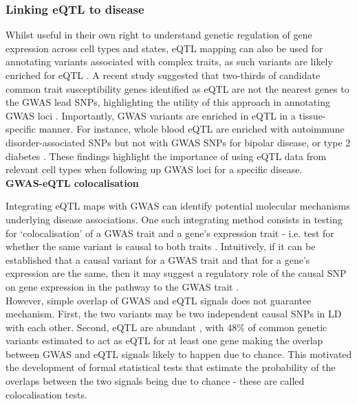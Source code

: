 \newpage

\subsubsection{Linking eQTL to disease}

Whilst useful in their own right to understand genetic regulation of gene expression across cell types and states, eQTL mapping can also be used for annotating variants associated with complex traits, as such variants are likely enriched for eQTL \cite{nicolae2010trait}. 
A recent study suggested that two-thirds of candidate common trait susceptibility genes identified as eQTL are not the nearest genes to the GWAS lead SNPs, highlighting the utility of this approach in annotating GWAS loci \cite{zhu2016integration}. 
Importantly, GWAS variants are enriched in eQTL in a tissue-specific manner. 
For instance, whole blood eQTL are enriched with autoimmune disorder-associated SNPs but not with GWAS SNPs for bipolar disease, or type 2 diabetes \cite{gtex2015genotype}. 
These findings highlight the importance of using eQTL data from relevant cell types when following up GWAS loci for a specific disease.\\

\textbf{GWAS-eQTL colocalisation}

Integrating eQTL maps with GWAS can identify potential molecular mechanisms underlying disease associations.
One such integrating method consists in testing for `colocalisation' of a GWAS trait and a gene’s expression trait - i.e. test for whether the same variant is causal to both traits \cite{cannon2018deciphering}.
Intuitively, if it can be established that a causal variant for a GWAS trait and that for a gene’s expression are the same, then it may suggest a regulatory role of the causal SNP on gene expression in the pathway to the GWAS trait \cite{he2013sherlock, ongen2017estimating}. \\

However, simple overlap of GWAS and eQTL signals does not guarantee mechanism. 
First, the two variants may be two independent causal SNPs in LD with each other.
Second, eQTL are abundant \cite{lappalainen2013transcriptome}, with 48\% of common genetic variants estimated to act as eQTL for at least one gene \cite{liu2019abundant} making the overlap between GWAS and eQTL signals likely to happen due to chance.
This motivated the development of formal statistical tests that estimate the probability of the overlaps between the two signals being due to chance - these are called colocalisation tests. \\

